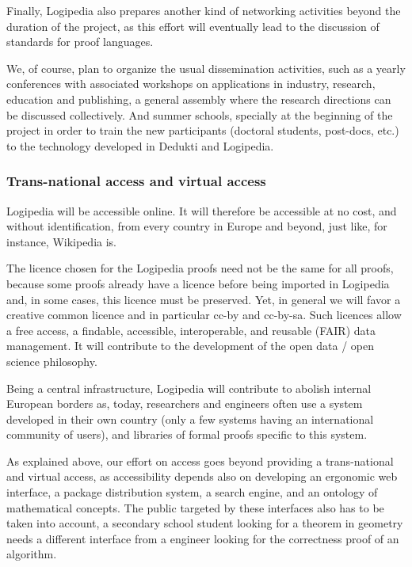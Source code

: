 Finally, Logipedia also prepares another kind of networking activities
beyond the duration of the project, as this effort will eventually
lead to the discussion of standards for proof languages.

We, of course, plan to organize the usual dissemination activities,
such as a yearly conferences with associated workshops on applications
in industry, research, education and publishing, a general assembly
where the research directions can be discussed collectively. And
summer schools, specially at the beginning of the project in order to
train the new participants (doctoral students, post-docs, etc.) to the
technology developed in Dedukti and Logipedia.


\subsubsection*{Trans-national access and virtual access}

Logipedia will be accessible online. It will therefore be accessible
at no cost, and without identification, from every country in Europe
and beyond, just like, for instance, Wikipedia is. 

The licence chosen for the Logipedia proofs need not be the same for
all proofs, because some proofs already have a licence before being
imported in Logipedia and, in some cases, this licence must be
preserved.  Yet, in general we will favor a creative common licence
and in particular cc-by and cc-by-sa.  Such licences allow a free
access, a findable, accessible, interoperable, and reusable (FAIR)
data management. It will contribute to the development of the open
data / open science philosophy.

Being a central infrastructure, Logipedia will contribute to abolish
internal European borders as, today, researchers and engineers often
use a system developed in their own country (only a few systems having
an international community of users), and libraries of formal proofs
specific to this system.

As explained above, our effort on access goes beyond providing a
trans-national and virtual access, as accessibility depends also on
developing an ergonomic web interface, a package distribution system,
a search engine, and an ontology of mathematical concepts. The public
targeted by these interfaces also has to be taken into account, a
secondary school student looking for a theorem in geometry needs a
different interface from a engineer looking for the correctness proof
of an algorithm.

